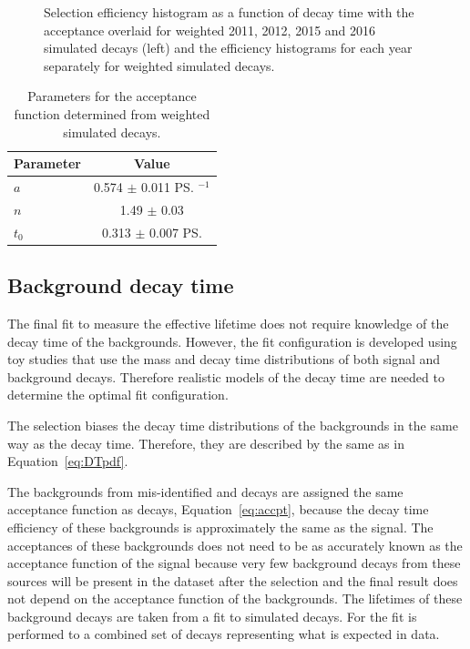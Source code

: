 {\begin{figure}[tbp]
    \caption{Selection efficiency histogram as a function of decay time with the acceptance \pdf overlaid for weighted 2011, 2012, 2015 and 2016 simulated \bsmumu decays (left) and the efficiency histograms for each year separately for weighted simulated \bsmumu decays. }
    \label{fig:accptplot}
\end{figure}


\begin{table}[tbp]
\begin{center}
\begin{tabular}{lc}
\hline
Parameter & Value \\
\hline
$a$ & 0.574 $\pm$ 0.011 \ps$^{-1}$\\
$n$ & 1.49 $\pm$ 0.03 \\
$t_{0}$ &  0.313 $\pm$ 0.007 \ps \\

\hline
\end{tabular}
\vspace{0.7cm}             
\caption{Parameters for the \bsmumu acceptance function determined from weighted simulated \bsmumu decays.}
\label{tab:accptsig}
\end{center}
\vspace{-1.0cm}                                                                                                                                               
\end{table}

\subsection{Background decay time \pdfs}
\label{sec:bkgDTpdf}

The final fit to measure the \bsmumu effective lifetime does not require knowledge of the decay time \pdfs of the backgrounds. However, the fit configuration is developed using toy studies that use the mass and decay time distributions of both signal and background decays. Therefore realistic models of the decay time \pdfs are needed to determine the optimal fit configuration. 


The selection biases the decay time distributions of the backgrounds in the same way as the \bsmumu decay time. Therefore, they are described by the same \pdfs as in Equation~\ref{eq:DTpdf}. 

The backgrounds from mis-identified and \bdmumu decays are assigned the same acceptance function as \bsmumu decays, Equation~\ref{eq:accpt}, because the decay time efficiency of these backgrounds is approximately the same as the signal. The acceptances of these backgrounds does not need to be as accurately known as the acceptance function of the signal because very few background decays from these sources will be present in the dataset after the selection and the final result does not depend on the acceptance function of the backgrounds. The lifetimes of these background decays are taken from a fit to simulated decays. For \bhh the fit is performed to a combined set of \bhh decays representing what is expected in data. %

}
